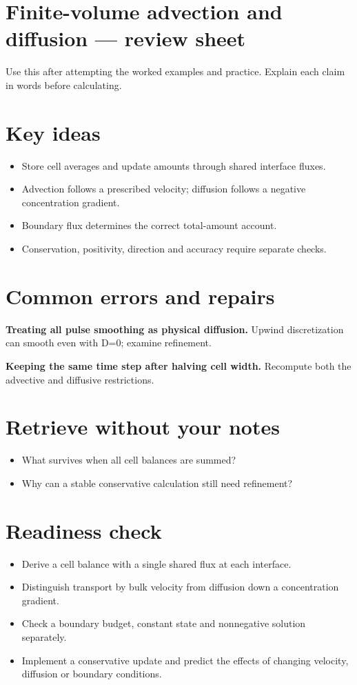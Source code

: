 \documentclass[11pt,letterpaper]{article}
\theoremstyle{definition}\newtheorem{definition}{Definition}\newtheorem{example}{Example}
\numberwithin{equation}{section}
\begin{document}
\section*{Finite-volume advection and diffusion --- review sheet}
Use this after attempting the worked examples and practice. Explain each claim in words before calculating.

\section*{Key ideas}
\begin{itemize}
\item Store cell averages and update amounts through shared interface fluxes.
\item Advection follows a prescribed velocity; diffusion follows a negative concentration gradient.
\item Boundary flux determines the correct total-amount account.
\item Conservation, positivity, direction and accuracy require separate checks.
\end{itemize}
\section*{Common errors and repairs}
\textbf{Treating all pulse smoothing as physical diffusion.} Upwind discretization can smooth even with D=\allowbreak{}0; examine refinement.

\textbf{Keeping the same time step after halving cell width.} Recompute both the advective and diffusive restrictions.

\section*{Retrieve without your notes}
\begin{itemize}
\item What survives when all cell balances are summed?
\item Why can a stable conservative calculation still need refinement?
\end{itemize}
\section*{Readiness check}
\begin{itemize}
\item Derive a cell balance with a single shared flux at each interface.
\item Distinguish transport by bulk velocity from diffusion down a concentration gradient.
\item Check a boundary budget, constant state and nonnegative solution separately.
\item Implement a conservative update and predict the effects of changing velocity, diffusion or boundary conditions.
\end{itemize}
\end{document}
